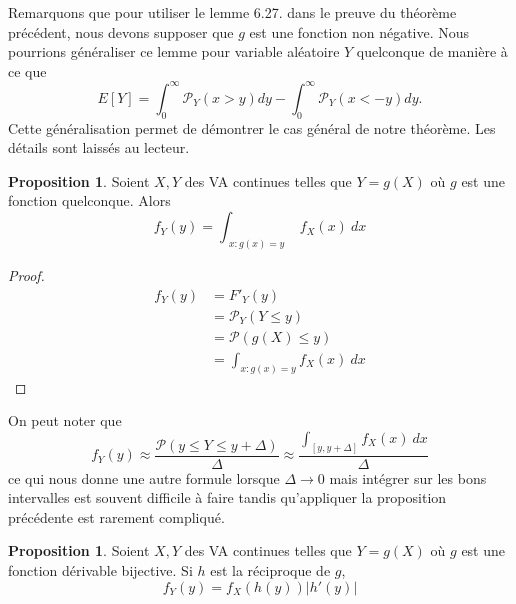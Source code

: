 \documentclass[a4paper,12pt]{report}
\theoremstyle{definition}
\newcommand{\ra}{\rightarrow}
\renewcommand{\(}{\left(}
\renewcommand{\)}{\right)}
\renewcommand{\P}{\mathcal{P}}
\newtheorem{prop}[thm]{Proposition}
\begin{document}
            
            Remarquons que pour utiliser le lemme 6.27. dans le preuve du théorème précédent, nous devons supposer que $g$ est une fonction non négative. Nous pourrions généraliser ce lemme pour variable aléatoire $Y$ quelconque de manière à ce que 
            $$E[Y] =  \displaystyle{\int_0^{\infty} \P_Y(x >y)dy} -  \displaystyle{\int_0^{\infty} \P_Y(x < -y)dy}.$$
            Cette généralisation permet de démontrer le cas général de notre théorème. Les détails sont laissés au lecteur.
            
            \begin{leftbar}
            \begin{prop}
                Soient $X,Y$ des VA continues telles que $Y = g(X)$ où $g$ est une fonction quelconque. Alors
                $$f_Y(y) = \int_{\substack{x: g(x)=y}}f_X(x)~dx$$
            \end{prop}
            \end{leftbar}
            
            \begin{proof}
                \begin{align*}
                    f_Y(y) &= F'_Y(y)\\
                    &= \P_Y(Y\leq y) \\
                    &= \P(g(X)\leq y) \\
                    &= \int_{x:g(x)=y}f_X(x)~dx
                \end{align*}
            \end{proof}
            
            On peut noter que
            $$f_Y(y)\approx\frac{\P(y\leq Y\leq y+\Delta)}{\Delta}\approx \frac{\int_{[y,y+\Delta]} f_X(x)~dx}{\Delta}$$ ce qui nous donne une autre formule lorsque $\Delta \ra 0$ mais intégrer sur les bons intervalles est souvent difficile à faire tandis qu'appliquer la proposition précédente est rarement compliqué.
            
            \begin{leftbar}
            \begin{prop}
                Soient $X,Y$ des VA continues telles que $Y=g(X)$ où $g$ est une fonction dérivable bijective. Si $h$ est la réciproque de $g$,
                $$f_Y(y) = f_X(h(y))|h'(y)|$$
            \end{prop}
            \end{leftbar}
            
\end{document}
